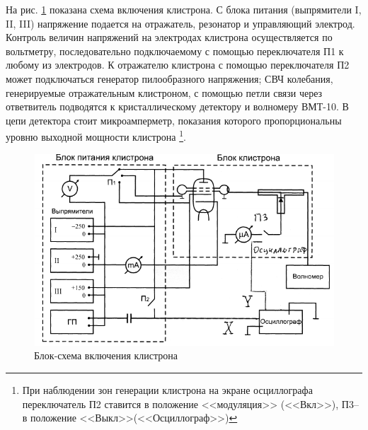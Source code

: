 На рис. \ref{fig:4} показана схема включения клистрона. С блока питания (выпрямители I, II, III) напряжение подается на отражатель, резонатор и управляющий электрод. Контроль величин напряжений на электродах клистрона осуществляется по вольтметру, последовательно подключаемому с помощью
переключателя П1 к любому из электродов. К отражателю клистрона с по­мощью переключателя П2 может подключаться генератор пилообразного
напряжения; СВЧ колебания, генерируемые отражательным клистроном, с помощью петли связи через ответвитель подводятся к кристаллическому
детектору и волномеру ВМТ-10. В цепи детектора стоит микроамперметр, показания которого пропорциональны уровню выходной мощности клистрона
\footnote{При наблюдении зон генерации клистрона на экране осциллографа переключатель П2 ставится  в положение <<модуляция>> (<<Вкл>>), П3--в положение <<Выкл>>(<<Осциллограф>>)}.
\begin{figure}[H]
	\centering
	\includegraphics[width=\textwidth]{fig/fig4}
	\caption{ Блок-схема включения клистрона}
	\label{fig:4}
\end{figure}

